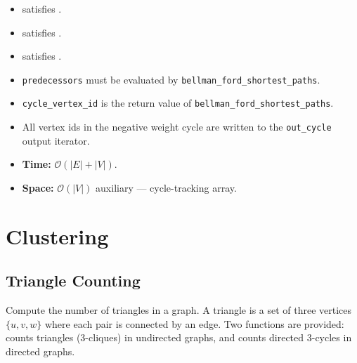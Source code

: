 {\small
      
}
\begin{itemdescr}
      \pnum\mandates
            \begin{itemize}
                  \item {} satisfies .
                  \item {} satisfies .
                  \item {} satisfies .
            \end{itemize}
      \pnum\preconditions
            \begin{itemize}
                  \item \lstinline{predecessors} must be evaluated by \lstinline{bellman_ford_shortest_paths}.
                  \item \lstinline{cycle_vertex_id} is the return value of \lstinline{bellman_ford_shortest_paths}.
            \end{itemize}
      \pnum\effects
            \begin{itemize}
                  \item
                        All vertex ids in the negative weight cycle are written to the \lstinline{out_cycle} output
                        iterator.
            \end{itemize}
      \pnum\complexity
            \begin{itemize}
                  \item \textbf{Time:} $\mathcal{O}(|E|+|V|)$.
                  \item \textbf{Space:} $\mathcal{O}(|V|)$ auxiliary --- cycle-tracking array.
            \end{itemize}
\end{itemdescr}

\section{Clustering}
\subsection{Triangle Counting}
Compute the number of triangles in a graph. A triangle is a set of three vertices $\{u, v, w\}$
where each pair is connected by an edge. Two functions are provided:
 counts triangles (3-cliques) in undirected graphs, and
 counts directed 3-cycles in directed graphs.

